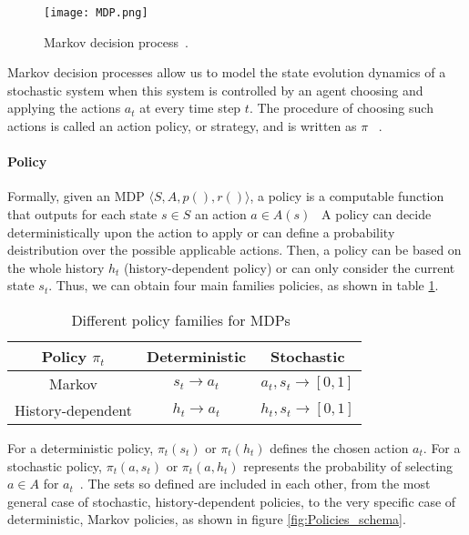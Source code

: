 \begin{figure}[h!]
	\centering
	\texttt{[image: MDP.png]}
	\caption{Markov decision process~\cite{Sigaud:2010:MDP:1841781}.}
	\label{fig:MDP}
\end{figure}

Markov decision processes allow us to model the state evolution dynamics of a stochastic system when this system is controlled by an agent choosing and applying the actions $a_t$ at every time step $t$. The procedure of choosing such actions is called an action policy, or strategy, and is written as $\pi$~\cite{Sigaud:2010:MDP:1841781} .

\paragraph{Policy} Formally, given an MDP $\bigl\langle S, A, p(), r() \bigr\rangle$, a policy is a computable function that outputs for each state $s \in S$ an action $a \in A(s)$~\cite{wiering2012reinforcement} A policy can decide deterministically upon the action to apply or can define a probability deistribution over the possible applicable actions. Then, a policy can be based on the whole history $h_t$ (history-dependent policy) or can only consider the current state $s_t$. Thus, we can obtain four main families policies, as shown in table \ref{table:T1}.

\begin{table}[h!]
\centering
\begin{tabular}{|c|c|c|}
	\hline Policy $\pi_t$
	&Deterministic &Stochastic  \\
	\hline 
	\hline Markov 
	&$s_t \rightarrow a_t$  &$a_t, s_t \rightarrow [0, 1]$ \\ 
	\hline History-dependent
	&$h_t \rightarrow a_t$  &$h_t, s_t \rightarrow [0,1]$  \\ 
	\hline 
\end{tabular}
\caption{Different policy families for MDPs~\cite{Sigaud:2010:MDP:1841781}}
\label{table:T1}
\end{table} 

For a deterministic policy, $\pi_t (s_t)$ or $\pi_t (h_t)$ defines the chosen action $a_t$. For a stochastic policy, $\pi_t (a, s_t)$ or $\pi_t (a, h_t)$ represents the probability of selecting $a \in A$ for $a_t$~\cite{Sigaud:2010:MDP:1841781}. The sets so defined are included in each other, from the most general case of stochastic, history-dependent policies, to the very specific case of deterministic, Markov policies, as shown in figure \ref{fig:Policies_schema}.

